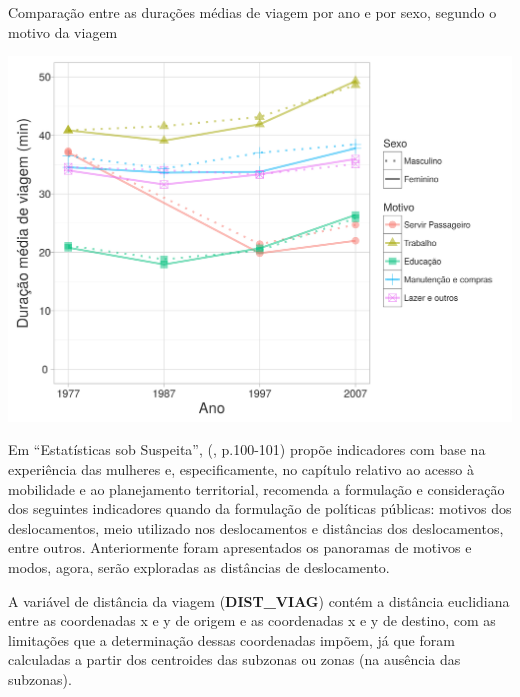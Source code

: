 \begin{grafico}[htb]%
    \caption{\label{graf:duracao-motivo}Comparação entre as durações médias de viagem por ano e por sexo, segundo o motivo da viagem}%
    \begin{center}%
        \includegraphics[width=1\textwidth]{./imagens/duracao-motivo.png}%
    \end{center}%
\end{grafico}%


Em “Estatísticas sob Suspeita”,  (\citeyear{CARRASCO2012}, p.100-101) propõe indicadores com base na experiência das mulheres e, especificamente, no capítulo relativo ao acesso à mobilidade e ao planejamento territorial, recomenda a formulação e consideração dos seguintes indicadores quando da formulação de políticas públicas:
motivos dos deslocamentos, meio utilizado nos deslocamentos e distâncias dos deslocamentos, entre outros.
Anteriormente foram apresentados os panoramas de motivos e modos, agora, serão exploradas as distâncias de deslocamento.

A variável de distância da viagem (\textbf{DIST_VIAG}) contém a distância euclidiana entre as coordenadas x e y de origem e as coordenadas x e y de destino, com as limitações que a determinação dessas coordenadas impõem, já que foram calculadas a partir dos centroides das subzonas ou zonas (na ausência das subzonas). 

